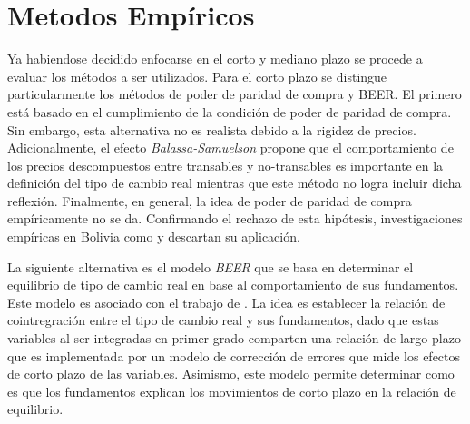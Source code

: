 \documentclass[12pt,letterpaper]{article}
\begin{document}


















\section{Metodos Empíricos}\label{tcr}

Ya habiendose decidido enfocarse en el corto y mediano plazo se procede a evaluar los métodos a ser utilizados. Para el corto plazo se distingue particularmente los métodos de poder de paridad de compra y BEER. El primero está basado en el cumplimiento de la condición de poder de paridad de compra. Sin embargo, esta alternativa no es realista debido a la rigidez de precios. Adicionalmente, el efecto \emph{Balassa-Samuelson} propone que el comportamiento de los precios descompuestos entre transables y no-transables \citep{balassa1968effective} es importante en la definición del tipo de cambio real mientras que este método no logra incluir dicha reflexión. Finalmente, en general, la idea de poder de paridad de compra empíricamente no se da. Confirmando el rechazo de esta hipótesis, investigaciones empíricas en Bolivia como \cite{lora2000tipo} y \cite{humerez2005reexaminando} descartan su aplicación.

La siguiente alternativa es el modelo \emph{BEER} que se basa en determinar el equilibrio de tipo de cambio real en base al comportamiento de sus fundamentos. Este modelo es asociado con el trabajo de \cite{clark1999exchange}. La idea es establecer la relación de cointregración entre el tipo de cambio real y sus fundamentos, dado que estas variables al ser integradas en primer grado comparten una relación de largo plazo que es implementada por un modelo de corrección de errores que mide los efectos de corto plazo de las variables. Asimismo, este modelo permite determinar como es que los fundamentos explican los movimientos de corto plazo en la relación de equilibrio.
\end{document}
